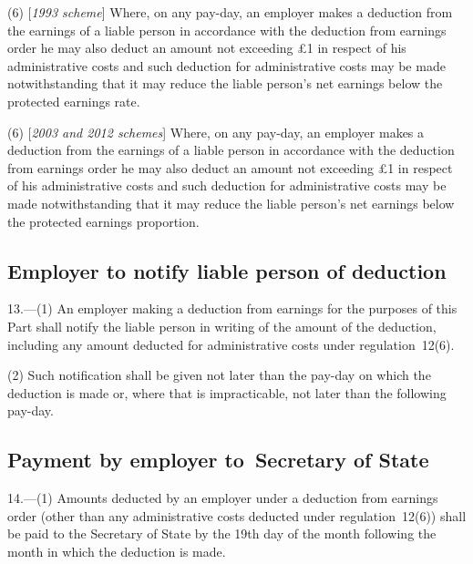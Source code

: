 \documentclass[12pt,a4paper]{article}
\begin{document}
(6) [\emph{1993 scheme}] Where, on any pay-day, an employer makes a deduction from the earnings of a liable person in accordance with the deduction from earnings order he may also deduct an amount not exceeding £1 in respect of his administrative costs and such deduction for administrative costs may be made notwithstanding that it may reduce the liable person’s net earnings below the protected earnings rate.

(6) [\emph{2003 and 2012 schemes}] Where, on any pay-day, an employer makes a deduction from the earnings of a liable person in accordance with the deduction from earnings order he may also deduct an amount not exceeding £1 in respect of his administrative costs and such deduction for administrative costs may be made notwithstanding that it may reduce the liable person’s net earnings below the  
protected earnings proportion.  %


\subsection[13. Employer to notify liable person of deduction]{Employer to notify liable person of deduction}

13.—(1) An employer making a deduction from earnings for the purposes of this Part shall notify the liable person in writing of the amount of the deduction, including any amount deducted for administrative costs under regulation~12(6).

(2) Such notification shall be given not later than the pay-day on which the deduction is made or, where that is impracticable, not later than the following pay-day.

\subsection[14. Payment by employer to~Secretary of State]{Payment by employer to~Secretary of State}

14.—(1) Amounts deducted by an employer under a deduction from earnings order (other than any administrative costs deducted under regulation~12(6)) shall be paid to the Secretary of State by the 19th day of the month following the month in which the deduction is made.
\end{document}
